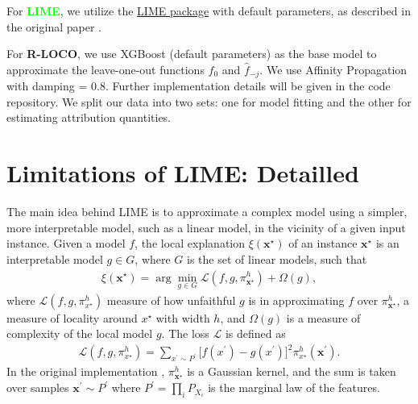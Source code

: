 \documentclass{article}
\newcommand\x{\boldsymbol{x}}
\theoremstyle{plain}
\theoremstyle{definition}
\theoremstyle{remark}
\newcommand{\ours}{\textcolor{ours}{\textbf{R-LOCO}}}
\newcommand{\lime}{\textcolor{lime}{\textbf{LIME}}}
\begin{document}
For \lime{}, we utilize the \href{https://github.com/marcotcr/lime}{LIME package} with default parameters, as described in the original paper \citep{lime}.

For \ours{}, we use XGBoost (default parameters) as the base model to approximate the leave-one-out functions \(\widehat{f}_0\) and \(\widehat{f}_{-j}\). We use Affinity Propagation with damping = 0.8. Further implementation details will be given in the code repository.  We split our data into two sets: one for model fitting and the other for estimating attribution quantities.

\section{Limitations of LIME: Detailled} \label{sup:lime_detailled}
The main idea behind LIME \citep{ribeiro2016why} is to approximate a complex model using a simpler, more interpretable model, such as a linear model, in the vicinity of a given input instance. Given a model $f$, the local explanation $\xi(\x^\star)$ of an instance $\x^\star$ is an interpretable model $g \in G$, where $G$ is the set of linear models, such that
\begin{align}
    \xi(\x^\star) = \arg \min_{g \in G} \mathcal{L}(f, g, \pi_{\x^\star}^h) + \Omega(g),
\end{align}
where $\mathcal{L}(f, g, \pi_{x^\star}^h)$ measure of how unfaithful $g$ is in approximating $f$ over $\pi_{\x^\star}^h$, a measure of locality around $x^\star$ with width $h$, and $\Omega(g)$ is a measure of complexity of the local model $g$. The loss $\mathcal{L}$ is defined as
\begin{align*}
    \mathcal{L}(f, g, \pi_{x^\star}^h) = \sum_{x^\prime \sim P^\prime} \big[f(x^\prime) - g(x^\prime) \big]^2 \pi_{x^\star}^h(\x^\prime).
\end{align*}
In the original implementation \citep{ribeiro2016why}, $\pi_{\x^\star}^h$ is a Gaussian kernel, and the sum is taken over samples $\x^\prime \sim P^\prime$ where $P^\prime = \prod_{i} P_{X_i}$ is the marginal law of the features. 
\end{document}
